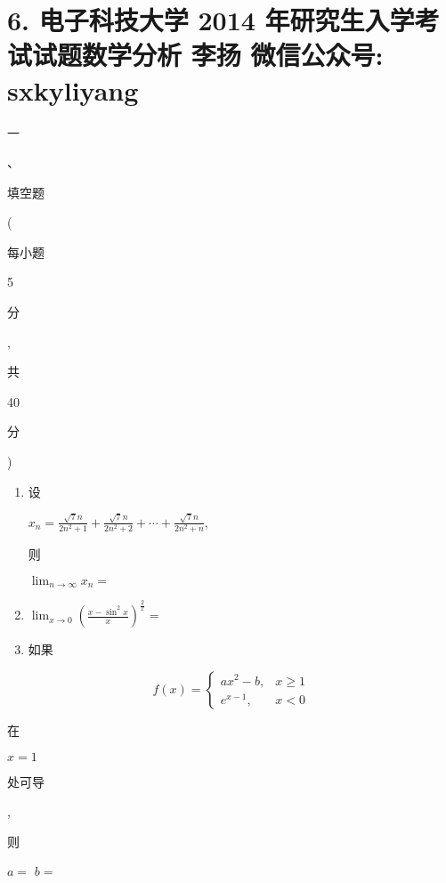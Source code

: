 \documentclass[10pt]{article}
\begin{document}
\section{6. 电子科技大学 2014 年研究生入学考试试题数学分析 
 李扬 
 微信公众号: sxkyliyang}
\begin{CJK}{UTF8}{mj}一\end{CJK}、\begin{CJK}{UTF8}{mj}填空题\end{CJK}(\begin{CJK}{UTF8}{mj}每小题\end{CJK} 5 \begin{CJK}{UTF8}{mj}分\end{CJK}, \begin{CJK}{UTF8}{mj}共\end{CJK} 40 \begin{CJK}{UTF8}{mj}分\end{CJK})

\begin{enumerate}
  \item \begin{CJK}{UTF8}{mj}设\end{CJK} $x_{n}=\frac{\sqrt{7} n}{2 n^{2}+1}+\frac{\sqrt{7} n}{2 n^{2}+2}+\cdots+\frac{\sqrt{7} n}{2 n^{2}+n}$, \begin{CJK}{UTF8}{mj}则\end{CJK} $\lim _{n \rightarrow \infty} x_{n}=$

  \item $\lim _{x \rightarrow 0}\left(\frac{x-\sin ^{2} x}{x}\right)^{\frac{2}{x}}=$

  \item \begin{CJK}{UTF8}{mj}如果\end{CJK}

\end{enumerate}
$$
f(x)= \begin{cases}a x^{2}-b, & x \geqslant 1 \\ e^{x-1}, & x<0\end{cases}
$$
\begin{CJK}{UTF8}{mj}在\end{CJK} $x=1$ \begin{CJK}{UTF8}{mj}处可导\end{CJK}, \begin{CJK}{UTF8}{mj}则\end{CJK} $a=$ $b=$
\end{document}

